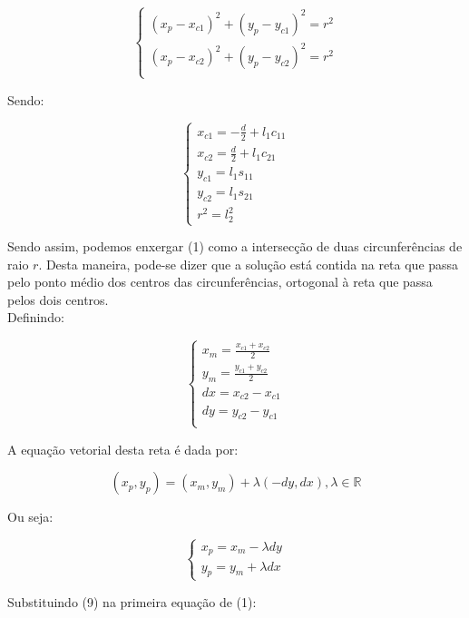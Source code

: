 \documentclass[12pt,a4paper]{article}
\begin{document}
\begin{itemize}
\begin{itemize}
		$$
		\begin{cases}
		(x_p - x_{c1})^2 + (y_p - y_{c1})^2 = r^2 \\
		(x_p - x_{c2})^2 + (y_p - y_{c2})^2 = r^2 \\
		\end{cases}
		$$
	
		Sendo:
	
		\begin{equation}
		\begin{cases}
		x_{c1} = -\frac{d}{2} + l_1 c_{11}\\
		x_{c2} =  \frac{d}{2} + l_1 c_{21} \\
		y_{c1} =  l_1 s_{11}\\
		y_{c2} =  l_1 s_{21} \\
		r^2 = l_2^2
		\end{cases}
		\end{equation}
	
		Sendo assim, podemos enxergar (1) como a intersecção de duas circunferências de raio $r$. Desta maneira, pode-se dizer que a solução está contida na reta que passa pelo ponto médio dos centros das circunferências, ortogonal à reta que passa pelos dois centros. \\
	
		Definindo:
	
		\begin{equation}
		\begin{cases}
		x_m = \frac{x_{c1}+x_{c2}}{2} \\
		y_m = \frac{y_{c1}+y_{c2}}{2} \\
		dx = x_{c2} - x_{c1} \\
		dy = y_{c2} - y_{c1} \\	
		\end{cases}
		\end{equation}
	
		A equação vetorial desta reta é dada por:
	
		$$ (x_p, y_p) = (x_m, y_m) + \lambda ( -dy, dx ), \lambda \in \mathbb{R} $$
	
		Ou seja:		
	
		\begin{equation}
		\begin{cases}
		x_p = x_m - \lambda dy \\
		y_p = y_m + \lambda dx
		\end{cases}	
		\end{equation}
	
		Substituindo (9) na primeira equação de (1):
	

\end{itemize}
\end{itemize}
\end{document}
